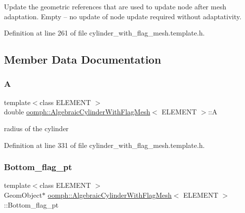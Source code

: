 Update the geometric references that are used to update node after mesh adaptation. Empty -- no update of node update required without adaptativity. 



Definition at line 261 of file cylinder\+\_\+with\+\_\+flag\+\_\+mesh.\+template.\+h.



\subsection{Member Data Documentation}
\mbox{\label{classoomph_1_1AlgebraicCylinderWithFlagMesh_aabc6cdfe508f04a4b1c92f2c2f1639c4}} 
\subsubsection{\texorpdfstring{A}{A}}
{\footnotesize\ttfamily template$<$class E\+L\+E\+M\+E\+NT $>$ \\
double \hyperlink{classoomph_1_1AlgebraicCylinderWithFlagMesh}{oomph\+::\+Algebraic\+Cylinder\+With\+Flag\+Mesh}$<$ E\+L\+E\+M\+E\+NT $>$\+::A\hspace{0.3cm}{\ttfamily [protected]}}



radius of the cylinder 



Definition at line 331 of file cylinder\+\_\+with\+\_\+flag\+\_\+mesh.\+template.\+h.

\mbox{\label{classoomph_1_1AlgebraicCylinderWithFlagMesh_ac1f7e1ba183ba813229302c5688ea1ba}} 
\subsubsection{\texorpdfstring{Bottom\+\_\+flag\+\_\+pt}{Bottom\_flag\_pt}}
{\footnotesize\ttfamily template$<$class E\+L\+E\+M\+E\+NT $>$ \\
Geom\+Object$\ast$ \hyperlink{classoomph_1_1AlgebraicCylinderWithFlagMesh}{oomph\+::\+Algebraic\+Cylinder\+With\+Flag\+Mesh}$<$ E\+L\+E\+M\+E\+NT $>$\+::Bottom\+\_\+flag\+\_\+pt\hspace{0.3cm}{\ttfamily [protected]}}



